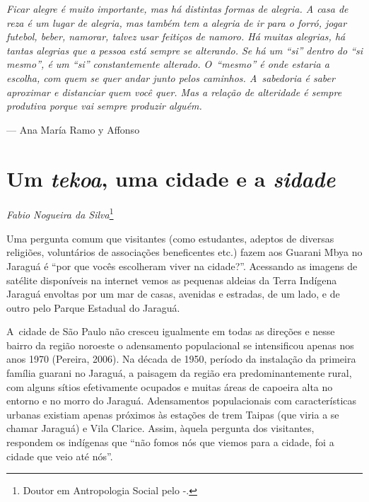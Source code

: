 \clearpage

\vspace*{\fill}

\begin{flushright}
\begin{minipage}[c]{0.85\textwidth}
\raggedleft
\footnotesize
\emph{Ficar alegre é muito importante, mas há distintas formas de alegria. A
casa de reza é um lugar de alegria, mas também tem a alegria de ir para
o forró, jogar futebol, beber, namorar, talvez usar feitiços de namoro.
Há muitas alegrias, há tantas alegrias que a pessoa está sempre se
alterando. Se há um ``si'' dentro do ``si mesmo'', é um ``si'' constantemente
alterado. O~``mesmo'' é onde estaria a escolha, com quem se quer andar
junto pelos caminhos. A~sabedoria é saber aproximar e distanciar quem
você quer. Mas a relação de alteridade é sempre produtiva porque vai
sempre produzir alguém.}

\smallskip
\hspace*{\fill}--- Ana María Ramo y Affonso
\end{minipage}
\end{flushright}

\thispagestyle{empty}

\chapter*{Um \emph{tekoa}, uma cidade e a \emph{sidade}}


\begin{flushright}
\emph{Fabio Nogueira da Silva}\footnote{Doutor em Antropologia Social pelo
-.}
\end{flushright}
\bigskip

\noindent Uma pergunta comum que visitantes (como estudantes, adeptos de diversas
religiões, voluntários de associações beneficentes etc.) fazem aos
Guarani Mbya no Jaraguá é ``por que vocês escolheram viver na cidade?''.
Acessando as imagens de satélite disponíveis na internet vemos as
pequenas aldeias da Terra Indígena Jaraguá envoltas por um mar de
casas, avenidas e estradas, de um lado, e de outro pelo Parque Estadual
do Jaraguá. 

A~cidade de São Paulo não cresceu igualmente em todas as direções e
nesse bairro da região noroeste o adensamento populacional se
intensificou apenas nos anos 1970 (Pereira, 2006). Na década de 1950,
período da instalação da primeira família guarani no Jaraguá, a
paisagem da região era predominantemente rural, com alguns sítios
efetivamente ocupados e muitas áreas de capoeira alta no entorno e no
morro do Jaraguá. Adensamentos populacionais com características
urbanas existiam apenas próximos às estações de trem Taipas (que viria
a se chamar Jaraguá) e Vila Clarice. Assim, àquela pergunta dos
visitantes, respondem os indígenas que ``não fomos nós que viemos para a
cidade, foi a cidade que veio até nós''. 

